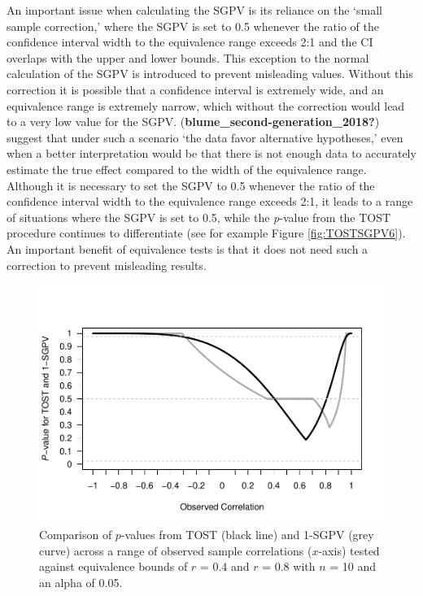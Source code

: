 \documentclass[
  english,
  man]{apa6}
\begin{document}
An important issue when calculating the SGPV is its reliance on the `small sample correction,' where the SGPV is set to 0.5 whenever the ratio of the confidence interval width to the equivalence range exceeds 2:1 and the CI overlaps with the upper and lower bounds. This exception to the normal calculation of the SGPV is introduced to prevent misleading values. Without this correction it is possible that a confidence interval is extremely wide, and an equivalence range is extremely narrow, which without the correction would lead to a very low value for the SGPV. (\textbf{blume\_second-generation\_2018?}) suggest that under such a scenario `the data favor alternative hypotheses,' even when a better interpretation would be that there is not enough data to accurately estimate the true effect compared to the width of the equivalence range. Although it is necessary to set the SGPV to 0.5 whenever the ratio of the confidence interval width to the equivalence range exceeds 2:1, it leads to a range of situations where the SGPV is set to 0.5, while the \emph{p}-value from the TOST procedure continues to differentiate (see for example Figure \ref{fig:TOSTSGPV6}). An important benefit of equivalence tests is that it does not need such a correction to prevent misleading results.

\begin{figure}

{\centering \includegraphics[height=0.94\textheight]{chp5_format-Rmd_bib_files/figure-latex/TOSTSGPV13-1} 

}

\caption{Comparison of $p$-values from TOST (black line) and 1-SGPV (grey curve) across a range of observed sample correlations ($x$-axis) tested against equivalence bounds of $r$ = 0.4 and $r$ = 0.8 with $n$ = 10 and an alpha of 0.05.}\label{fig:TOSTSGPV13}
\end{figure}
\end{document}
